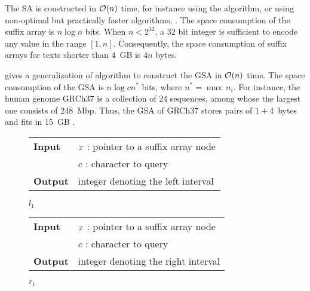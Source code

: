 The SA is constructed in $\mathcal{O}(n)$ time, for instance using the \citep{Kaerkkaeinen2003} algorithm, or using non-optimal but practically faster algorithms, \eg \citep{Schuermann2007}.
The space consumption of the suffix array is $n \log{n}$ bits.
When $n < 2^{32}$, a 32 bit integer is sufficient to encode any value in the range $[1,n]$.
Consequently, the space consumption of suffix arrays for texts shorter than 4~GB is $4 n$ bytes.

\cite{Weese2013} gives a generalization of \citeauthor{Kaerkkaeinen2003} algorithm to construct the GSA in $\mathcal{O}(n)$ time.
The space consumption of the GSA is $n \log{cn^*}$ bits, where $n^* = \max{\,n_i}$.
For instance, the human genome GRCh37 is a collection of 24 sequences, among whose the largest one consists of 248~Mbp.
Thus, the GSA of GRCh37 stores pairs of $1+4$~bytes and fits in 15~GB \citep{Weese2013}.

\begin{figure*}[t!]
\begin{minipage}[t]{.5\textwidth}
\begin{algorithm}[H]
\begin{tabular}{ll}
\textbf{Input}  & $x$ : pointer to a suffix array node\\
				& $c$ : character to query\\
\textbf{Output} & integer denoting the left interval\\
\end{tabular}
\begin{algorithmic}[1]
	\Else
	\EndIf
\EndWhile
\State \Return $l_1$
\end{algorithmic}
\label{alg:sa-lower}
\end{algorithm}
\end{minipage}
\hfill
\begin{minipage}[t]{.5\textwidth}
\begin{algorithm}[H]
\begin{tabular}{ll}
\textbf{Input}  & $x$ : pointer to a suffix array node\\
				& $c$ : character to query\\
\textbf{Output} & integer denoting the right interval\\
\end{tabular}
\begin{algorithmic}[1]
	\Else
	\EndIf
\EndWhile
\State \Return $r_1$
\end{algorithmic}
\label{alg:sa-upper}
\end{algorithm}
\end{minipage}
\end{figure*}

